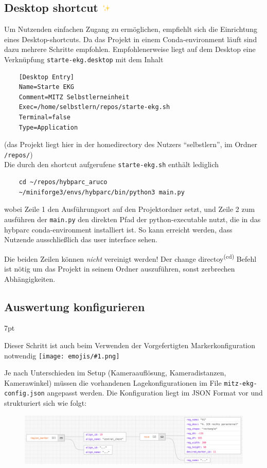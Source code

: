\documentclass[a4paper, 10pt]{article}
\newcommand{\code}[1]{\texttt{#1}}
\newcommand{\emoji}[1]{
    \begingroup\normalfont
    \texttt{[image: emojis/\#1.png]}
    \endgroup
}
\newenvironment{tooltip}{%
\small
\vspace*{-4mm}
    \def\FrameCommand{%
    \hspace{1pt}%
    {\color{tooltippipe}\vrule width 0.7mm}%
    {\color{tooltipshade}\vrule width 1.5mm}%
    \colorbox{tooltipshade}%
    }%
    \MakeFramed{\advance\hsize-\width\FrameRestore}%
    \noindent%
    \begin{adjustwidth}{}{7pt}%
    \vspace{2pt}\vspace{2pt}%
}
{%
    \vspace{2pt}\end{adjustwidth}\endMakeFramed%
}
\begin{document}
\subsection{Desktop shortcut \includegraphics[height=0.75em]{emojis/sparkles.png}}
\label{ssec:desktop-drip}
Um Nutzenden einfachen Zugang zu ermöglichen, empfiehlt sich die Einrichtung eines Desktop-shortcuts. Da das Projekt in einem Conda-environment läuft sind dazu mehrere Schritte empfohlen. Empfohlenerweise liegt auf dem Desktop eine Verknüpfung \code{starte-ekg.desktop} mit dem Inhalt
\begin{verbatim}
    [Desktop Entry]
    Name=Starte EKG
    Comment=MITZ Selbstlerneinheit
    Exec=/home/selbstlern/repos/starte-ekg.sh
    Terminal=false
    Type=Application
\end{verbatim}
{\footnotesize(das Projekt liegt hier in der homedirectory des Nutzers \enquote{selbstlern}, im Ordner \code{/repos/})}\\
Die durch den shortcut aufgerufene \code{starte-ekg.sh} enthält lediglich
\begin{verbatim}
    cd ~/repos/hybparc_aruco
    ~/miniforge3/envs/hybparc/bin/python3 main.py
\end{verbatim}
wobei Zeile 1 den Ausführungsort auf den Projektordner setzt, und Zeile 2 zum ausführen der \code{main.py} den direkten Pfad der python-executable nutzt, die in das hybparc conda-environment installiert ist. So kann erreicht werden, dass Nutzende ausschließlich das user interface sehen.

Die beiden Zeilen können \emph{nicht} vereinigt werden! Der change directoy\textsuperscript{(cd)} Befehl ist nötig um das Projekt in seinem Ordner auszuführen, sonst zerbrechen Abhängigkeiten.

\subsection{Auswertung konfigurieren}
\label{ssec:configure-configuration}
\begin{tooltip}
    Dieser Schritt ist auch beim Verwenden der Vorgefertigten Markerkonfiguration notwendig\emoji{head-shaking-vertically}
\end{tooltip}
Je nach Unterschieden im Setup (Kameraauflösung, Kameradistanzen, Kamerawinkel) müssen die vorhandenen Lagekonfigurationen im File \code{mitz-ekg-config.json} angepasst werden. Die Konfiguration liegt im JSON Format vor und strukturiert sich wie folgt:
\begin{figure}[H]
    \centering
    \includegraphics[width=13.5cm]{json-tree.png}
\end{figure}
\end{document}
